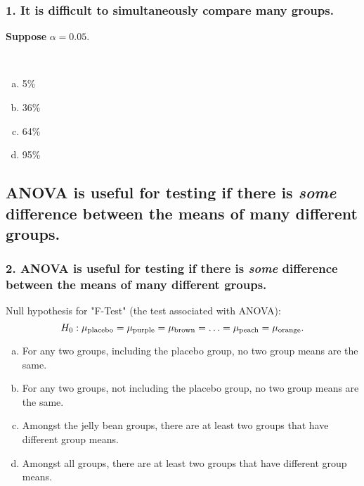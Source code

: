 \documentclass[11pt,containsverbatim,handout,xcolor=xelatex,dvipsnames,table]{beamer}
\newcommand{\solnMultOn}[3]{#3}
\newcommand{\mainideaA}{It is difficult to simultaneously compare many groups.}
\newcommand{\mainideaB}{ANOVA is useful for testing if there is \emph{some} difference
  between the means of many different groups.}
\begin{document}
\begin{frame}
  \frametitle{1. \mainideaA}

  \textbf{Suppose} $\alpha = 0.05$.


    \pause

    \hfill \\

      \begin{enumerate}[(a)]
      \item 5\%
      \item 36\%
      \item \solnMultOn{2}{3}{64\%}
      \item 95\%
      \end{enumerate}


\end{frame}


\subsection{\mainideaB}
\label{mi2}


\begin{frame}
  \frametitle{2. \mainideaB}

Null hypothesis for "F-Test" (the test associated with ANOVA):
\[
H_0: \mu_{\textmd{placebo}} = \mu_{\textmd{purple}} = \mu_{\textmd{brown}} =
\ldots = \mu_{\textmd{peach}} = \mu_{\textmd{orange}} .
\]

\pause


\begin{enumerate}[(a)]
\item For any two groups, including the placebo group, no two group means are the same.
\item For any two groups, not including the placebo group, no two group means are the
  same.
\item Amongst the jelly bean groups, there are at least two groups that have different group means.
\item \solnMultOn{2}{3}{Amongst all groups, there are at least two groups that have different group means.}
\end{enumerate}

\end{frame}
\end{document}
